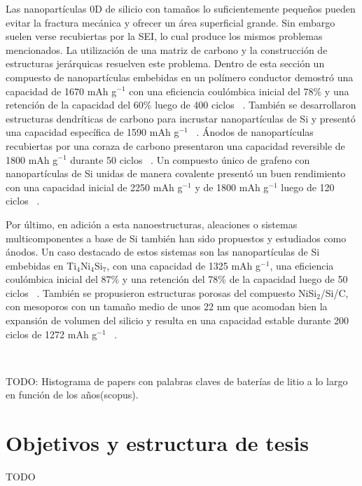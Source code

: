 Las nanopartículas 0D de silicio con tamaños lo suficientemente pequeños pueden 
evitar la fractura mecánica y ofrecer un área superficial grande. Sin embargo 
suelen verse recubiertas por la SEI, lo cual produce los mismos problemas 
mencionados. La utilización de una matriz de carbono y la construcción de 
estructuras jerárquicas resuelven este problema. Dentro de esta sección un
compuesto de nanopartículas embebidas en un polímero conductor demostró una 
capacidad de 1670 mAh g$^{-1}$ con una eficiencia coulómbica inicial del 78\% y 
una retención de la capacidad del 60\% luego de 400 ciclos ~\cite{chen2014}. 
También se desarrollaron estructuras dendríticas de carbono para incrustar 
nanopartículas de Si y presentó una capacidad específica de 1590 mAh g$^{-1}$ 
~\cite{magasinski2010}. Ánodos de nanopartículas recubiertas por una coraza de 
carbono presentaron una capacidad reversible de 1800 mAh g$^{-1}$ durante 50 
ciclos ~\cite{hwa2012}. Un compuesto único de grafeno con nanopartículas de Si 
unidas de manera covalente presentó un buen rendimiento con una capacidad inicial 
de 2250 mAh g$^{-1}$ y de 1800 mAh g$^{-1}$ luego de 120 ciclos ~\cite{wen2013}.

Por último, en adición a esta nanoestructuras, aleaciones o sistemas 
multicomponentes a base de Si también han sido propuestos y estudiados como 
ánodos. Un caso destacado de estos sistemas son las nanopartículas de Si 
embebidas en Ti$_4$Ni$_4$Si$_7$, con una capacidad de 1325 mAh g$^{-1}$, una 
eficiencia coulómbica inicial del 87\% y una retención del 78\% de la capacidad 
luego de 50 ciclos ~\cite{son2012}. También se propusieron estructuras porosas 
del compuesto NiSi$_2$/Si/C, con mesoporos con un tamaño medio de unos 22 nm que
acomodan bien la expansión de volumen del silicio y resulta en una capacidad 
estable durante 200 ciclos de 1272 mAh g$^{-1}$ ~\cite{jia2015}.

\

TODO: Histograma de papers con palabras claves de baterías de litio a lo largo en
función de los años(scopus).

\section{Objetivos y estructura de tesis}

TODO
